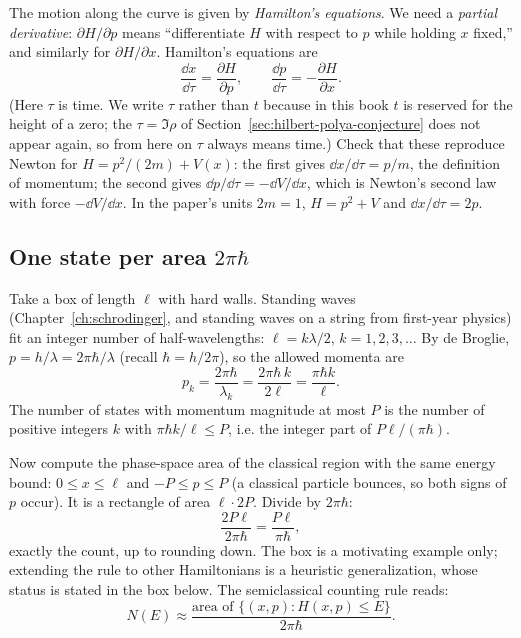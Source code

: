 The motion along the curve is given by \emph{Hamilton's equations}. We need a \emph{partial derivative}: $\partial H/\partial p$ means ``differentiate $H$ with respect to $p$ while holding $x$ fixed,'' and similarly for $\partial H/\partial x$. Hamilton's equations are
\begin{equation}
\frac{\dd x}{\dd \tau}=\frac{\partial H}{\partial p},\qquad \frac{\dd p}{\dd \tau}=-\frac{\partial H}{\partial x}.
\label{eq:hilbert-polya-hamilton}
\end{equation}
(Here $\tau$ is time. We write $\tau$ rather than $t$ because in this book $t$ is reserved for the height of a zero; the $\tau=\Im\rho$ of Section~\ref{sec:hilbert-polya-conjecture} does not appear again, so from here on $\tau$ always means time.) Check that these reproduce Newton for $H=p^2/(2m)+V(x)$: the first gives $\dd x/\dd \tau=p/m$, the definition of momentum; the second gives $\dd p/\dd \tau=-\dd V/\dd x$, which is Newton's second law with force $-\dd V/\dd x$. In the paper's units $2m=1$, $H=p^2+V$ and $\dd x/\dd \tau=2p$.

\subsection{One state per area $2\pi\hbar$}

Take a box of length $\ell$ with hard walls. Standing waves (Chapter~\ref{ch:schrodinger}, and standing waves on a string from first-year physics) fit an integer number of half-wavelengths: $\ell=k\lambda/2$, $k=1,2,3,\dots$ By de Broglie, $p=h/\lambda=2\pi\hbar/\lambda$ (recall $\hbar=h/2\pi$), so the allowed momenta are
\begin{equation}
p_k=\frac{2\pi\hbar}{\lambda_k}=\frac{2\pi\hbar\,k}{2\ell}=\frac{\pi\hbar k}{\ell}.
\end{equation}
The number of states with momentum magnitude at most $P$ is the number of positive integers $k$ with $\pi\hbar k/\ell\le P$, i.e. the integer part of $P\ell/(\pi\hbar)$.

Now compute the phase-space area of the classical region with the same energy bound: $0\le x\le\ell$ and $-P\le p\le P$ (a classical particle bounces, so both signs of $p$ occur). It is a rectangle of area $\ell\cdot2P$. Divide by $2\pi\hbar$:
\begin{equation}
\frac{2P\ell}{2\pi\hbar}=\frac{P\ell}{\pi\hbar},
\end{equation}
exactly the count, up to rounding down. The box is a motivating example only; extending the rule to other Hamiltonians is a heuristic generalization, whose status is stated in the box below. The semiclassical counting rule reads:
\begin{equation}
N(E)\approx\frac{\text{area of }\{(x,p):H(x,p)\le E\}}{2\pi\hbar}.
\label{eq:hilbert-polya-weyl}
\end{equation}

